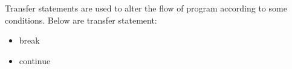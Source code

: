 \setlength{\columnsep}{3pt}
\begin{flushleft}

	Transfer statements are used to alter the flow of program according to some conditions.
	Below are transfer statement:
	\begin{itemize}
		\item break
		\item continue
	\end{itemize}
	
\end{flushleft}



